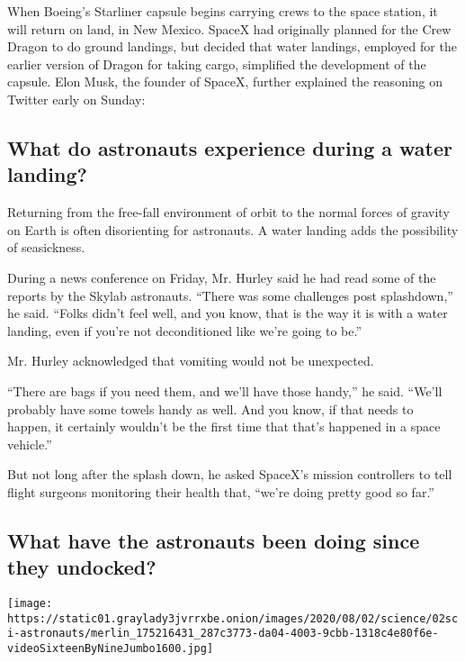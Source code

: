 When Boeing's Starliner capsule begins carrying crews to the space
station, it will return on land, in New Mexico. SpaceX had originally
planned for the Crew Dragon to do ground landings, but decided that
water landings, employed for the earlier version of Dragon for taking
cargo, simplified the development of the capsule. Elon Musk, the founder
of SpaceX, further explained the reasoning on Twitter early on Sunday:

\hypertarget{what-do-astronauts-experience-during-a-water-landing}{%
\subsection{What do astronauts experience during a water
landing?}\label{what-do-astronauts-experience-during-a-water-landing}}

Returning from the free-fall environment of orbit to the normal forces
of gravity on Earth is often disorienting for astronauts. A water
landing adds the possibility of seasickness.

During a news conference on Friday, Mr. Hurley said he had read some of
the reports by the Skylab astronauts. ``There was some challenges post
splashdown,'' he said. ``Folks didn't feel well, and you know, that is
the way it is with a water landing, even if you're not deconditioned
like we're going to be.''

Mr. Hurley acknowledged that vomiting would not be unexpected.

``There are bags if you need them, and we'll have those handy,'' he
said. ``We'll probably have some towels handy as well. And you know, if
that needs to happen, it certainly wouldn't be the first time that
that's happened in a space vehicle.''

But not long after the splash down, he asked SpaceX's mission
controllers to tell flight surgeons monitoring their health that,
``we're doing pretty good so far.''

\hypertarget{what-have-the-astronauts-been-doing-since-they-undocked}{%
\subsection{What have the astronauts been doing since they
undocked?}\label{what-have-the-astronauts-been-doing-since-they-undocked}}

\texttt{[image: https://static01.graylady3jvrrxbe.onion/images/2020/08/02/science/02sci-astronauts/merlin\_175216431\_287c3773-da04-4003-9cbb-1318c4e80f6e-videoSixteenByNineJumbo1600.jpg]}

